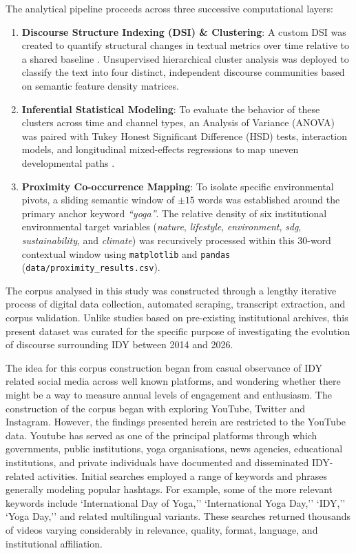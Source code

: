\documentclass[11pt]{article}
\begin{document}
The analytical pipeline proceeds across three successive computational layers:
\begin{enumerate}
    \item \textbf{Discourse Structure Indexing (DSI) \& Clustering}: A custom DSI was created to quantify structural changes in textual metrics over time relative to a shared baseline \cite{paranyushkin2019}. Unsupervised hierarchical cluster analysis was deployed to classify the text into four distinct, independent discourse communities based on semantic feature density matrices.
    \item \textbf{Inferential Statistical Modeling}: To evaluate the behavior of these clusters across time and channel types, an Analysis of Variance (ANOVA) was paired with Tukey Honest Significant Difference (HSD) tests, interaction models, and longitudinal mixed-effects regressions to map uneven developmental paths \cite{gries2015}.
    \item \textbf{Proximity Co-occurrence Mapping}: To isolate specific environmental pivots, a sliding semantic window of $\pm15$ words was established around the primary anchor keyword \textit{``yoga''}. The relative density of six institutional environmental target variables (\textit{nature}, \textit{lifestyle}, \textit{environment}, \textit{sdg}, \textit{sustainability}, and \textit{climate}) was recursively processed within this 30-word contextual window using \texttt{matplotlib} and \texttt{pandas} (\texttt{data/proximity\_results.csv}).
\end{enumerate}

The corpus analysed in this study was constructed through a lengthy iterative process of digital data collection, automated scraping, transcript extraction, and corpus validation. Unlike studies based on pre-existing institutional archives, this present dataset was curated for the specific purpose of investigating the evolution of discourse surrounding IDY between 2014 and 2026.

The idea for this corpus construction began from casual observance of IDY related social media across well known platforms, and wondering whether there might be a way to measure annual levels of engagement and enthusiasm. The construction of the corpus began with exploring YouTube, Twitter and Instagram. However, the findings presented herein are restricted to the YouTube data. Youtube has served as one of the principal platforms through which governments, public institutions, yoga organisations, news agencies, educational institutions, and private individuals have documented and disseminated IDY-related activities. Initial searches employed a range of keywords and phrases generally modeling popular hashtags. For example, some of the more relevant keywords include `International Day of Yoga,'' `International Yoga Day,'' `IDY,'' `Yoga Day,'' and related multilingual variants. These searches returned thousands of videos varying considerably in relevance, quality, format, language, and institutional affiliation.
\end{document}
